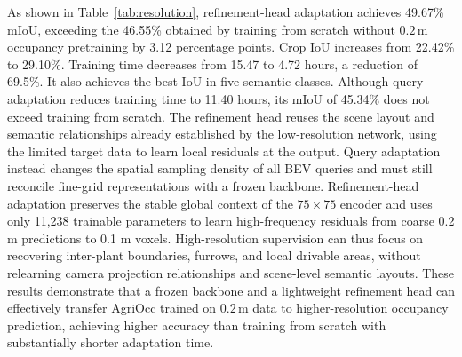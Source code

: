 \documentclass[a4paper,fleqn]{cas-sc}
\begin{document}
\begin{table}[pos=htbp]
\centering
\caption{Voxel-resolution transfer. IoUs are reported in \%, and time denotes logged wall-clock hours for 15 epochs of target-resolution training and per-epoch validation, excluding source training at $0.2\,\mathrm{m}$. All configurations output $150\times150\times25$ voxels.}
\label{tab:resolution}
\end{table}

As shown in Table~\ref{tab:resolution}, refinement-head adaptation achieves 49.67\% mIoU, exceeding the 46.55\% obtained by training from scratch without $0.2\,\mathrm{m}$ occupancy pretraining by 3.12 percentage points. Crop IoU increases from 22.42\% to 29.10\%.
Training time decreases from 15.47 to 4.72 hours, a reduction of 69.5\%. It also achieves the best IoU in five semantic classes.
Although query adaptation reduces training time to 11.40 hours, its mIoU of 45.34\% does not exceed training from scratch.
The refinement head reuses the scene layout and semantic relationships already established by the low-resolution network, using the limited target data to learn local residuals at the output. Query adaptation instead changes the spatial sampling density of all BEV queries and must still reconcile fine-grid representations with a frozen backbone.
Refinement-head adaptation preserves the stable global context of the $75\times75$ encoder and uses only 11,238 trainable parameters to learn high-frequency residuals from coarse 0.2 m predictions to 0.1 m voxels.
High-resolution supervision can thus focus on recovering inter-plant boundaries, furrows, and local drivable areas, without relearning camera projection relationships and scene-level semantic layouts.
These results demonstrate that a frozen backbone and a lightweight refinement head can effectively transfer AgriOcc trained on $0.2\,\mathrm{m}$ data to higher-resolution occupancy prediction, achieving higher accuracy than training from scratch with substantially shorter adaptation time.
\end{document}
